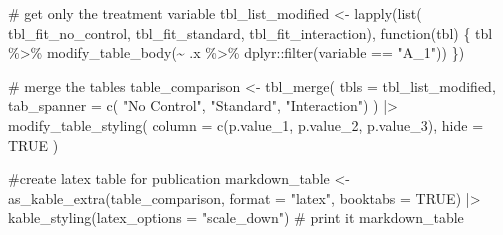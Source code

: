 \documentclass[
  singlecolumn]{article}
\newenvironment{Shaded}{\begin{snugshade}}{\end{snugshade}}
\newcommand{\AttributeTok}[1]{\textcolor[rgb]{0.40,0.45,0.13}{#1}}
\newcommand{\CommentTok}[1]{\textcolor[rgb]{0.37,0.37,0.37}{#1}}
\newcommand{\ConstantTok}[1]{\textcolor[rgb]{0.56,0.35,0.01}{#1}}
\newcommand{\ControlFlowTok}[1]{\textcolor[rgb]{0.00,0.23,0.31}{#1}}
\newcommand{\FunctionTok}[1]{\textcolor[rgb]{0.28,0.35,0.67}{#1}}
\newcommand{\NormalTok}[1]{\textcolor[rgb]{0.00,0.23,0.31}{#1}}
\newcommand{\OtherTok}[1]{\textcolor[rgb]{0.00,0.23,0.31}{#1}}
\newcommand{\SpecialCharTok}[1]{\textcolor[rgb]{0.37,0.37,0.37}{#1}}
\newcommand{\StringTok}[1]{\textcolor[rgb]{0.13,0.47,0.30}{#1}}
\begin{document}
\begin{Shaded}
\begin{Highlighting}[]
\CommentTok{\# get only the treatment variable}
\NormalTok{tbl\_list\_modified }\OtherTok{\textless{}{-}} \FunctionTok{lapply}\NormalTok{(}\FunctionTok{list}\NormalTok{(}
\NormalTok{  tbl\_fit\_no\_control,}
\NormalTok{  tbl\_fit\_standard,}
\NormalTok{  tbl\_fit\_interaction),}
\ControlFlowTok{function}\NormalTok{(tbl) \{}
\NormalTok{  tbl }\SpecialCharTok{\%\textgreater{}\%}
    \FunctionTok{modify\_table\_body}\NormalTok{(}\SpecialCharTok{\textasciitilde{}}\NormalTok{ .x }\SpecialCharTok{\%\textgreater{}\%}\NormalTok{ dplyr}\SpecialCharTok{::}\FunctionTok{filter}\NormalTok{(variable }\SpecialCharTok{==} \StringTok{"A\_1"}\NormalTok{))}
\NormalTok{\})}


\CommentTok{\# merge the tables}
\NormalTok{table\_comparison }\OtherTok{\textless{}{-}} \FunctionTok{tbl\_merge}\NormalTok{(}
  \AttributeTok{tbls =}\NormalTok{ tbl\_list\_modified,}
  \AttributeTok{tab\_spanner =} \FunctionTok{c}\NormalTok{(}
    \StringTok{"No Control"}\NormalTok{,}
    \StringTok{"Standard"}\NormalTok{,}
    \StringTok{"Interaction"}\NormalTok{)}
\NormalTok{) }\SpecialCharTok{|\textgreater{}}
  \FunctionTok{modify\_table\_styling}\NormalTok{(}
    \AttributeTok{column =} \FunctionTok{c}\NormalTok{(p.value\_1, p.value\_2, p.value\_3),}
    \AttributeTok{hide =} \ConstantTok{TRUE}
\NormalTok{  )}

\CommentTok{\#create latex table for publication}
\NormalTok{markdown\_table }\OtherTok{\textless{}{-}}
  \FunctionTok{as\_kable\_extra}\NormalTok{(table\_comparison, }\AttributeTok{format =} \StringTok{"latex"}\NormalTok{, }\AttributeTok{booktabs =} \ConstantTok{TRUE}\NormalTok{) }\SpecialCharTok{|\textgreater{}}
  \FunctionTok{kable\_styling}\NormalTok{(}\AttributeTok{latex\_options =} \StringTok{"scale\_down"}\NormalTok{)}
\CommentTok{\# print it}
\NormalTok{markdown\_table}
\end{Highlighting}
\end{Shaded}

\begin{table}
\centering
{}
\end{table}
\end{document}
